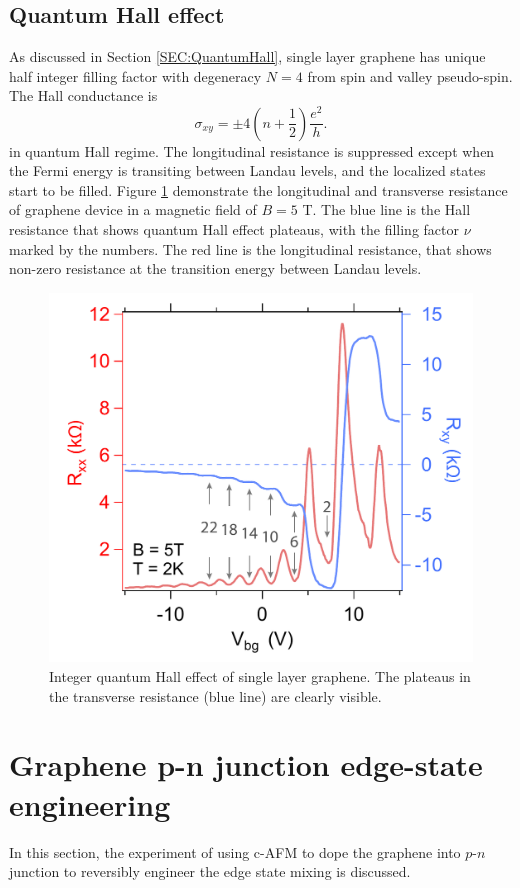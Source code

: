 \documentclass[pdflatex, sectionletters, 12pt]{pittetd}    %
\begin{document}
\subsection{Quantum Hall effect}

As discussed in Section \ref{SEC:QuantumHall}, single layer graphene has unique half integer filling factor with degeneracy $N = 4$ from spin and valley pseudo-spin. The Hall conductance is
$$
\sigma_{xy} = \pm 4\left(n + \frac{1}{2}\right)\frac{e^2}{h}.
$$
in quantum Hall regime. The longitudinal resistance is suppressed except when the Fermi energy is transiting between Landau levels, and the localized states start to be filled. Figure \ref{FIG:HallResistance} demonstrate the longitudinal and transverse resistance of graphene device in a magnetic field of $B = 5$ T. The blue line is the Hall resistance that shows quantum Hall effect plateaus, with the filling factor $\nu$ marked by the numbers. The red line is the longitudinal resistance, that shows non-zero resistance at the transition energy between Landau levels.
\\

\begin{figure}[h!]
	\centering
	\includegraphics[width=.55\textwidth]{Drawing/HallResistance.pdf}
	\caption{Integer quantum Hall effect of single layer graphene. The plateaus in the transverse resistance (blue line) are clearly visible.}
	\label{FIG:HallResistance}
\end{figure}

\section{Graphene p-n junction edge-state engineering}
\label{SEC:PNJunction}

In this section, the experiment of using c-AFM to dope the graphene into $p$-$n$ junction to reversibly engineer the edge state mixing is discussed.
\end{document}

